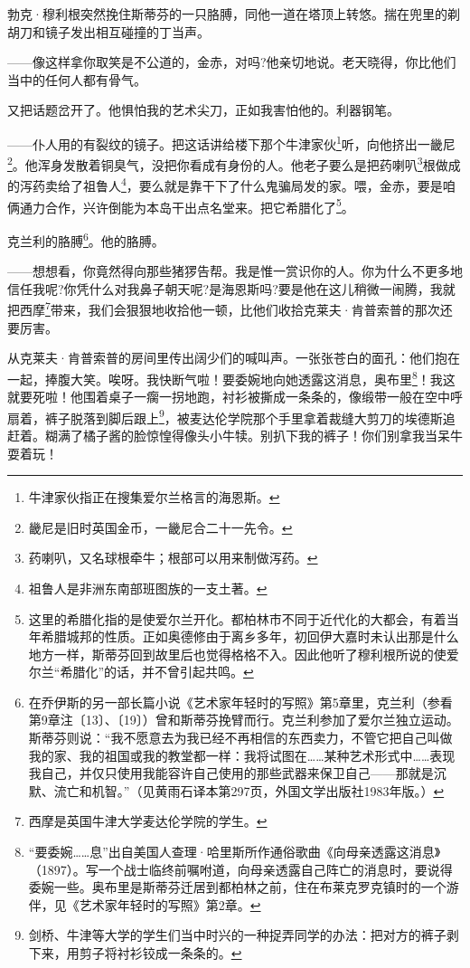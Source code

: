 \par 勃克·穆利根突然挽住斯蒂芬的一只胳膊，同他一道在塔顶上转悠。揣在兜里的剃胡刀和镜子发出相互碰撞的丁当声。
\par ——像这样拿你取笑是不公道的，金赤，对吗?他亲切地说。老天晓得，你比他们当中的任何人都有骨气。
\par 又把话题岔开了。他惧怕我的艺术尖刀，正如我害怕他的。利器钢笔。
\par ——仆人用的有裂纹的镜子。把这话讲给楼下那个牛津家伙\footnote{牛津家伙指正在搜集爱尔兰格言的海恩斯。}听，向他挤出一畿尼\footnote{畿尼是旧时英国金币，一畿尼合二十一先令。}。他浑身发散着铜臭气，没把你看成有身份的人。他老子要么是把药喇叭\footnote{药喇叭，又名球根牵牛；根部可以用来制做泻药。}根做成的泻药卖给了祖鲁人\footnote{祖鲁人是非洲东南部班图族的一支土著。}，要么就是靠干下了什么鬼骗局发的家。喂，金赤，要是咱俩通力合作，兴许倒能为本岛干出点名堂来。把它希腊化了\footnote{这里的希腊化指的是使爱尔兰开化。都柏林市不同于近代化的大都会，有着当年希腊城邦的性质。正如奥德修由于离乡多年，初回伊大嘉时未认出那是什么地方一样，斯蒂芬回到故里后也觉得格格不入。因此他听了穆利根所说的使爱尔兰“希腊化”的话，并不曾引起共鸣。}。
\par 克兰利的胳膊\footnote{在乔伊斯的另一部长篇小说《艺术家年轻时的写照》第5章里，克兰利（参看第9章注〔13〕、〔19〕）曾和斯蒂芬挽臂而行。克兰利参加了爱尔兰独立运动。斯蒂芬则说：“我不愿意去为我已经不再相信的东西卖力，不管它把自己叫做我的家、我的祖国或我的教堂都一样：我将试图在……某种艺术形式中……表现我自己，并仅只使用我能容许自己使用的那些武器来保卫自己——那就是沉默、流亡和机智。”（见黄雨石译本第297页，外国文学出版社1983年版。）}。他的胳膊。
\par ——想想看，你竟然得向那些猪猡告帮。我是惟一赏识你的人。你为什么不更多地信任我呢?你凭什么对我鼻子朝天呢?是海恩斯吗?要是他在这儿稍微一闹腾，我就把西摩\footnote{西摩是英国牛津大学麦达伦学院的学生。}带来，我们会狠狠地收拾他一顿，比他们收拾克莱夫·肯普索普的那次还要厉害。
\par 从克莱夫·肯普索普的房间里传出阔少们的喊叫声。一张张苍白的面孔：他们抱在一起，捧腹大笑。唉呀。我快断气啦！要委婉地向她透露这消息，奥布里\footnote{“要委婉……息”出自美国人查理·哈里斯所作通俗歌曲《向母亲透露这消息》（1897）。写一个战士临终前嘱咐道，向母亲透露自己阵亡的消息时，要说得委婉一些。奥布里是斯蒂芬迁居到都柏林之前，住在布莱克罗克镇时的一个游伴，见《艺术家年轻时的写照》第2章。}！我这就要死啦！他围着桌子一瘸一拐地跑，衬衫被撕成一条条的，像缎带一般在空中呼扇着，裤子脱落到脚后跟上\footnote{剑桥、牛津等大学的学生们当中时兴的一种捉弄同学的办法：把对方的裤子剥下来，用剪子将衬衫铰成一条条的。}，被麦达伦学院那个手里拿着裁缝大剪刀的埃德斯追赶着。糊满了橘子酱的脸惊惶得像头小牛犊。别扒下我的裤子！你们别拿我当呆牛耍着玩！
